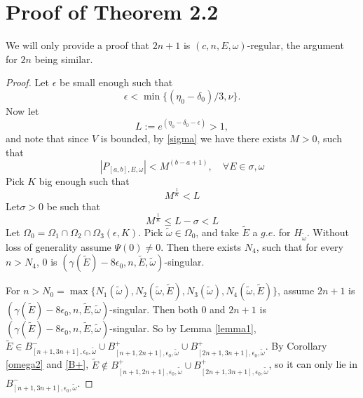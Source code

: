 \section{Proof of Theorem 2.2}
We will only provide a proof that $2n+1$ is $(c, n, E,\omega)$-regular, the argument for $2n$ being similar.
\begin{proof}
Let $\epsilon$ be small enough such that
  \begin{equation}\label{epsilon1}
    \epsilon<\min\{(\eta_0-\delta_0)/3,\nu\}.
  \end{equation}
Now let
  \[L:=e^{(\eta_0-\delta_0-\epsilon)}>1,\]
and note that since $V$ is bounded, by \eqref{sigma} we have there exists $ M>0$, such that
\[
|P_{[a,b],E,\omega}|<M^{(b-a+1)},\quad \forall E\in\sigma,\omega
\]
Pick $K$ big enough such that
  \[M^{\frac{1}{K}}<L\]
Let$ \sigma>0$ be such that
\begin{equation}\label{K}
M^{\frac{1}{K}}\leq L-\sigma<L
\end{equation}
Let $\Omega_0=\Omega_1\cap\Omega_2\cap\Omega_3(\epsilon,K)$. Pick $\tilde{\omega}\in\Omega_0$, and take $\tilde{E}$ a $g.e.$ for $H_{\tilde{\omega}}$.
Without loss of generality assume $\Psi(0)\neq 0$. Then there exists $ N_4$, such that for every $ n>N_4$, 0 is $(\gamma(\tilde{E})-8\epsilon_0,n,\tilde{E},\tilde{\omega})$-singular.


For $n>N_0=\max\{N_1(\tilde{\omega}),N_2(\tilde{\omega},\tilde{E}),N_3(\tilde{\omega}),N_4(\tilde{\omega},\tilde{E})\}$, assume $2n+1$ is $(\gamma(\tilde{E})-8\epsilon_0,n,\tilde{E},\tilde{\omega})$-singular.
 Then both $0$ and $2n+1$ is $(\gamma(\tilde{E})-8\epsilon_0,n,\tilde{E},\tilde{\omega})$-singular. So by Lemma \ref{lemma1},
  $\tilde{E}\in B_{[n+1,3n+1],\epsilon_0,\tilde{\omega}}^-\cup B_{[n+1,2n+1],\epsilon_0,\tilde{\omega}}^+ \cup B_{[2n+1,3n+1],\epsilon_0,\tilde{\omega}}^+ $.
  By Corollary \ref{omega2} and \eqref{B+}, $\tilde{E}\notin B_{[n+1,2n+1],\epsilon_0,\tilde{\omega}}^+\cup B_{[2n+1,3n+1],\epsilon_0,\tilde{\omega}}^+$, so it can only lie in $B_{[n+1,3n+1],\epsilon_0,\tilde{\omega}}^-$.


\end{proof}
